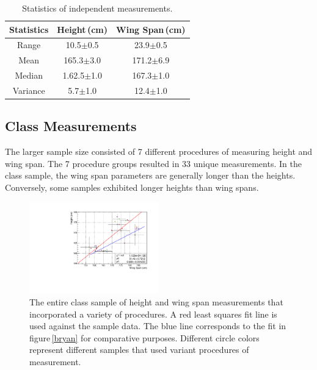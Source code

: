 \documentclass[twocolumn]{aastex6}
\begin{document}
\begin{table}[h]
\begin{center}
\caption{Statistics of independent measurements.}

\begin{tabular}{ c|c|c }

Statistics & Height\,(cm)  & Wing Span\,(cm)\\ \hline \hline
Range & 10.5$\pm$0.5 & 23.9$\pm$0.5 \\
 Mean & 165.3$\pm$3.0 & 171.2$\pm$6.9 \\ 
 Median & 1.62.5$\pm$1.0 & 167.3$\pm$1.0 \\  
 Variance & 5.7$\pm$1.0 & 12.4$\pm$1.0 \\

\end{tabular}
\label{indtable}
\end{center}
\end{table}


\clearpage
\subsection{Class Measurements}
The larger sample size consisted of 7 different procedures of measuring height and wing span. The 7 procedure groups resulted in 33 unique measurements. In the class sample, the wing span parameters are generally longer than the heights. Conversely, some samples exhibited longer heights than wing spans.

\begin{figure}[h]
  \centering
    \includegraphics[width=0.5\textwidth]{doublecorr.pdf}
      \caption{The entire class sample of height and wing span measurements that incorporated a variety of procedures. A red least squares fit line is used against the sample data. The blue line corresponds to the fit in figure\,\ref{bryan} for comparative purposes. Different circle colors represent different samples that used variant procedures of measurement. }
      \label{class}
\end{figure}
\end{document}
